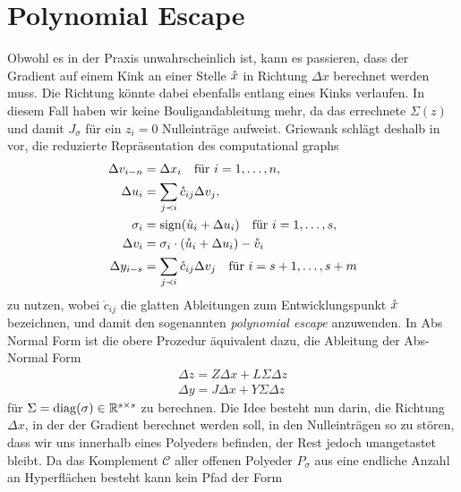 \section{Polynomial Escape}
Obwohl es in der Praxis unwahrscheinlich ist, kann es passieren, dass der Gradient auf einem Kink an einer Stelle $\mathring{x}$ in Richtung $\Delta x$ berechnet werden muss. Die Richtung könnte dabei ebenfalls entlang eines Kinks verlaufen.
In diesem Fall haben wir keine Bouligandableitung mehr, da das errechnete $\Sigma(z)$ und damit $J_\sigma$ für ein $z_i=0$ Nulleinträge aufweist. Griewank schlägt deshalb in \cite[S.29]{monster} vor, die reduzierte Repräsentation des computational graphs 
\begin{equation}
 \begin{aligned}
  \Delta v_{i-n} &= \Delta x_i \quad \text{für } i=1,\ldots,n, \\
  \Delta u_i &= \sum_{j\prec i} \mathring c_{ij}\Delta v_j,\\
  \sigma_i& = \text{sign}(\mathring u_i + \Delta u_i) \quad \text{für } i=1,\ldots,s,\\
  \Delta v_i &= \sigma_i \cdot (\mathring u_i+\Delta u_i) - \mathring{v}_i\\
  \Delta y_{i-s}& = \sum_{j\prec i} \mathring c_{ij} \Delta v_j \quad \text{für } i=s+1, \ldots, s+m
 \end{aligned}
 \label{eq:minComputationalGraphRepr}
\end{equation}
zu nutzen, wobei $\mathring c_{ij}$ die glatten Ableitungen zum Entwicklungspunkt $\mathring{x}$ bezeichnen, und damit den sogenannten \textit{polynomial escape} anzuwenden. In Abs Normal Form ist die obere Prozedur äquivalent dazu, die Ableitung der Abs-Normal Form 
\begin{equation}
\begin{aligned}
  \Delta z = Z\Delta x + L\Sigma \Delta z \\
 \Delta y = J\Delta x + Y\Sigma \Delta z  
\end{aligned}
\label{eq:jacAbsNormalForm}
\end{equation}
für $\Sigma = \operatorname{diag}(\sigma) \in \mathbb{R}^{s\times s}$ zu berechnen. Die Idee besteht nun darin, die Richtung $\Delta x$, in der der Gradient berechnet werden soll, in den Nulleinträgen so zu stören, dass wir uns innerhalb eines Polyeders befinden, der Rest jedoch unangetastet bleibt. Da das Komplement $\mathcal C$ aller offenen Polyeder $P_\sigma$ aus eine endliche Anzahl an Hyperflächen  besteht kann kein Pfad der Form
